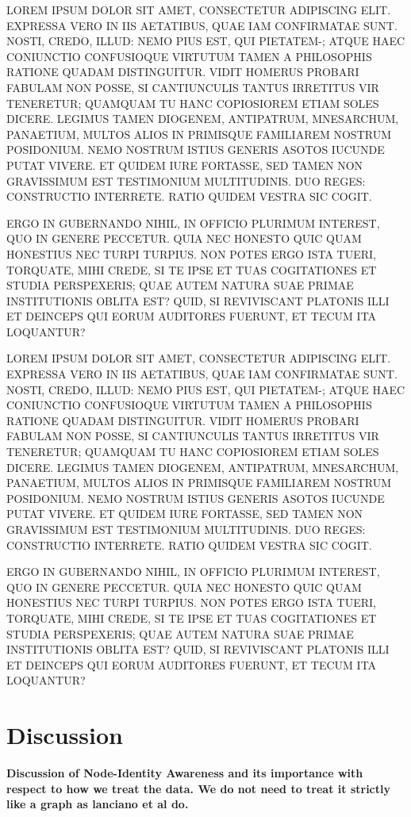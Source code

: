 \documentclass[letterpaper]{article}
\begin{document}
LOREM IPSUM DOLOR SIT AMET, CONSECTETUR ADIPISCING ELIT. EXPRESSA VERO IN IIS AETATIBUS, QUAE IAM CONFIRMATAE SUNT. NOSTI, CREDO, ILLUD: NEMO PIUS EST, QUI PIETATEM-; ATQUE HAEC CONIUNCTIO CONFUSIOQUE VIRTUTUM TAMEN A PHILOSOPHIS RATIONE QUADAM DISTINGUITUR. VIDIT HOMERUS PROBARI FABULAM NON POSSE, SI CANTIUNCULIS TANTUS IRRETITUS VIR TENERETUR; QUAMQUAM TU HANC COPIOSIOREM ETIAM SOLES DICERE. LEGIMUS TAMEN DIOGENEM, ANTIPATRUM, MNESARCHUM, PANAETIUM, MULTOS ALIOS IN PRIMISQUE FAMILIAREM NOSTRUM POSIDONIUM. NEMO NOSTRUM ISTIUS GENERIS ASOTOS IUCUNDE PUTAT VIVERE. ET QUIDEM IURE FORTASSE, SED TAMEN NON GRAVISSIMUM EST TESTIMONIUM MULTITUDINIS. DUO REGES: CONSTRUCTIO INTERRETE. RATIO QUIDEM VESTRA SIC COGIT.

ERGO IN GUBERNANDO NIHIL, IN OFFICIO PLURIMUM INTEREST, QUO IN GENERE PECCETUR. QUIA NEC HONESTO QUIC QUAM HONESTIUS NEC TURPI TURPIUS. NON POTES ERGO ISTA TUERI, TORQUATE, MIHI CREDE, SI TE IPSE ET TUAS COGITATIONES ET STUDIA PERSPEXERIS; QUAE AUTEM NATURA SUAE PRIMAE INSTITUTIONIS OBLITA EST? QUID, SI REVIVISCANT PLATONIS ILLI ET DEINCEPS QUI EORUM AUDITORES FUERUNT, ET TECUM ITA LOQUANTUR?

LOREM IPSUM DOLOR SIT AMET, CONSECTETUR ADIPISCING ELIT. EXPRESSA VERO IN IIS AETATIBUS, QUAE IAM CONFIRMATAE SUNT. NOSTI, CREDO, ILLUD: NEMO PIUS EST, QUI PIETATEM-; ATQUE HAEC CONIUNCTIO CONFUSIOQUE VIRTUTUM TAMEN A PHILOSOPHIS RATIONE QUADAM DISTINGUITUR. VIDIT HOMERUS PROBARI FABULAM NON POSSE, SI CANTIUNCULIS TANTUS IRRETITUS VIR TENERETUR; QUAMQUAM TU HANC COPIOSIOREM ETIAM SOLES DICERE. LEGIMUS TAMEN DIOGENEM, ANTIPATRUM, MNESARCHUM, PANAETIUM, MULTOS ALIOS IN PRIMISQUE FAMILIAREM NOSTRUM POSIDONIUM. NEMO NOSTRUM ISTIUS GENERIS ASOTOS IUCUNDE PUTAT VIVERE. ET QUIDEM IURE FORTASSE, SED TAMEN NON GRAVISSIMUM EST TESTIMONIUM MULTITUDINIS. DUO REGES: CONSTRUCTIO INTERRETE. RATIO QUIDEM VESTRA SIC COGIT.

ERGO IN GUBERNANDO NIHIL, IN OFFICIO PLURIMUM INTEREST, QUO IN GENERE PECCETUR. QUIA NEC HONESTO QUIC QUAM HONESTIUS NEC TURPI TURPIUS. NON POTES ERGO ISTA TUERI, TORQUATE, MIHI CREDE, SI TE IPSE ET TUAS COGITATIONES ET STUDIA PERSPEXERIS; QUAE AUTEM NATURA SUAE PRIMAE INSTITUTIONIS OBLITA EST? QUID, SI REVIVISCANT PLATONIS ILLI ET DEINCEPS QUI EORUM AUDITORES FUERUNT, ET TECUM ITA LOQUANTUR?



\section{Discussion}
\textbf{Discussion of Node-Identity Awareness and its importance with respect to how we treat the data. We do not need to treat it strictly like a graph as lanciano et al do.}
\end{document}
